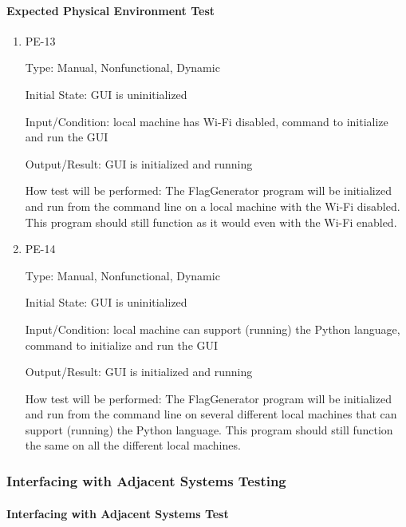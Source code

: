 \documentclass[12pt, titlepage]{article}
\begin{document}
\paragraph{Expected Physical Environment Test}

\begin{enumerate}

\item{PE-13\\}

Type: Manual, Nonfunctional, Dynamic

Initial State: GUI is uninitialized

Input/Condition: local machine has Wi-Fi disabled, command to initialize and
run the GUI

Output/Result: GUI is initialized and running

How test will be performed: The FlagGenerator program will be initialized and
run from the command line on a local machine with the Wi-Fi disabled. This
program should still function as it would even with the Wi-Fi enabled.

\item{PE-14\\}

Type: Manual, Nonfunctional, Dynamic

Initial State: GUI is uninitialized

Input/Condition: local machine can support (running) the Python language,
command to initialize and run the GUI

Output/Result: GUI is initialized and running

How test will be performed: The FlagGenerator program will be initialized and
run from the command line on several different local machines that can support
(running) the Python language. This program should still function the same on
all the different local machines.

\end{enumerate}

\subsubsection{Interfacing with Adjacent Systems Testing}

\paragraph{Interfacing with Adjacent Systems Test}
\end{document}
